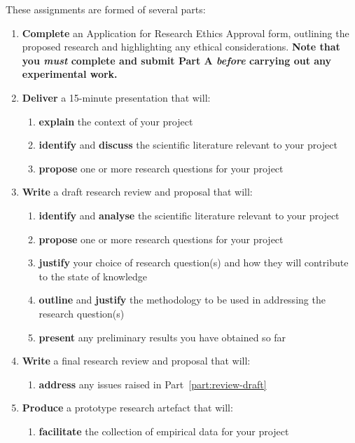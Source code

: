 \documentclass{../fal_assignment}
\begin{document}
These assignments are formed of several parts:
\begin{enumerate}[label=(\Alph*)]
	\item \textbf{Complete} an Application for Research Ethics Approval form,
		outlining the proposed research and highlighting any ethical
		considerations.
		\textbf{Note that you \textit{must} complete and submit Part A
		\textit{before} carrying out any experimental work.}
	\item \textbf{Deliver} a 15-minute presentation that will:
		\begin{enumerate}[label=(\roman*)]
			\item \textbf{explain} the context of your project
			\item \textbf{identify} and \textbf{discuss} the scientific literature
				relevant to your project
			\item \textbf{propose} one or more research questions for your project
		\end{enumerate}
	\item \label{part:review-draft} \textbf{Write} a draft research review and proposal
		that will:
		\begin{enumerate}[label=(\roman*)]
			\item \textbf{identify} and \textbf{analyse} the scientific literature
				relevant to your project
			\item \textbf{propose} one or more research questions for your project
			\item \textbf{justify} your choice of research question(s)
				and how they will contribute to the state of knowledge
			\item \textbf{outline} and \textbf{justify} the methodology to be used
				in addressing the research question(s)
			\item \textbf{present} any preliminary results you have obtained so far
		\end{enumerate}
	\item \textbf{Write} a final research review and proposal that will:
		\begin{enumerate}[label=(\roman*)]
			\item \textbf{address} any issues raised in Part~\ref{part:review-draft}
		\end{enumerate}
	\item \textbf{Produce} a prototype research artefact that will:
		\begin{enumerate}[label=(\roman*)]
			\item \textbf{facilitate} the collection of empirical data for your project

\end{enumerate}
\end{enumerate}
\end{document}
